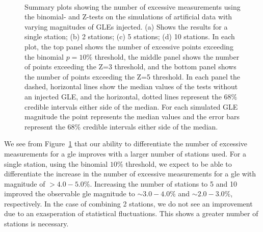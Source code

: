 \begin{figure}[!htbp!]
	 \\
	
	\caption{Summary plots showing the number of excessive measurements using the binomial- and Z-tests on the simulations of artificial data with varying magnitudes of GLEs injected. (a) Shows the results for a single station; (b) 2 stations; (c) 5 stations; (d) 10 stations. In each plot, the top panel shows the number of excessive points exceeding the binomial $p = 10 \%$ threshold, the middle panel shows the number of points exceeding the Z=3 threshold, and the bottom panel shows the number of points exceeding the Z=5 threshold. In each panel the dashed, horizontal lines show the median values of the tests without an injected GLE, and the horizontal, dotted lines represent the $68 \%$ credible intervals either side of the median. For each simulated GLE magnitude the point represents the median values and the error bars represent the $68 \%$ credible intervals either side of the median.}
	\label{fig:multi_HS14008_sims}
\end{figure}

We see from Figure~\ref{fig:multi_HS14008_sims} that our ability to differentiate the number of excessive measurements for a \gls{gle} improves with a larger number of stations used. For a single station, using the binomial $10 \%$ threshold, we expect to be able to differentiate the increase in the number of excessive measurements for a \gls{gle} with magnitude of $> 4.0 - 5.0 \%$. Increasing the number of stations to 5 and 10 improved the observable \gls{gle} magnitude to $\sim 3.0 - 4.0 \%$ and $\sim 2.0 - 3.0 \%$, respectively. In the case of combining 2 stations, we do not see an improvement due to an exasperation of statistical fluctuations. This shows a greater number of stations is necessary.

